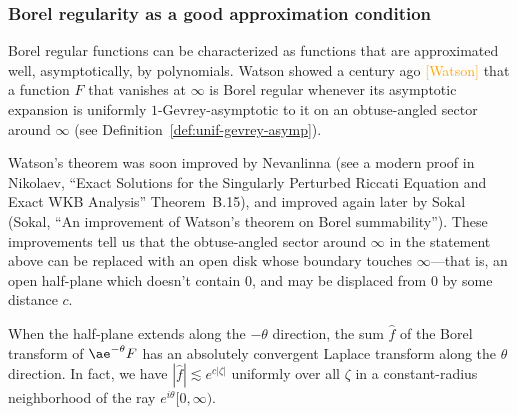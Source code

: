 \documentclass{article}
\theoremstyle{definition}
\newcommand{\aexp}{\ae}
\begin{document}
\subsubsection{Borel regularity as a good approximation condition}
Borel regular functions can be characterized as functions that are approximated well, asymptotically, by polynomials. Watson showed a century ago \textcolor{orange}{[Watson]} that a function $F$ that vanishes at $\infty$ is Borel regular whenever its asymptotic expansion is uniformly $1$-Gevrey-asymptotic to it on an obtuse-angled sector around $\infty$ (see Definition~\ref{def:unif-gevrey-asymp}).

Watson's theorem was soon improved by Nevanlinna (see a modern proof in Nikolaev, ``Exact Solutions for the Singularly Perturbed Riccati Equation and Exact WKB Analysis'' Theorem~B.15), and improved again later by Sokal (Sokal, ``An improvement of Watson's theorem on Borel summability''). These improvements tell us that the obtuse-angled sector around $\infty$ in the statement above can be replaced with an open disk whose boundary touches $\infty$---that is, an open half-plane which doesn't contain $0$, and may be displaced from $0$ by some distance $c$.
\begin{center}
\end{center}
When the half-plane extends along the $-\theta$ direction, the sum $\hat{f}$ of the Borel transform of $\aexp^{-\theta} F$ has an absolutely convergent Laplace transform along the $\theta$ direction. In fact, we have $|\hat{f}| \lesssim e^{c |\zeta|}$ uniformly over all $\zeta$ in a constant-radius neighborhood of the ray $e^{i\theta}[0, \infty)$. 
\end{document}

